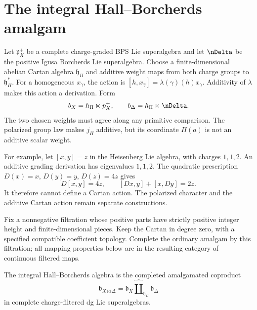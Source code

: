 \section{The integral Hall--Borcherds amalgam}
Let $\mathfrak p_X^+$ be a complete charge-graded BPS Lie superalgebra
and let $\nDelta$ be the positive Igusa Borcherds Lie superalgebra.
Choose a finite-dimensional abelian Cartan algebra $\mathfrak h_\Pi$ and additive
weight maps from both charge groups to $\mathfrak h_\Pi^*$.
For a homogeneous $x_\gamma$, the action is
$[h,x_\gamma]=\lambda(\gamma)(h)x_\gamma$.
Additivity of $\lambda$ makes this action a derivation. Form
\[
 \mathfrak b_X=\mathfrak h_\Pi\ltimes\mathfrak p_X^+,
 \qquad
 \mathfrak b_\Delta=\mathfrak h_\Pi\ltimes\nDelta.
\]
The two chosen weights must agree along any primitive comparison.
The polarized group law makes $j_\Pi$ additive, but its coordinate
$\Pi(a)$ is not an additive scalar weight.

For example, let $[x,y]=z$ in the Heisenberg Lie algebra, with charges
$1,1,2$. An additive grading derivation has eigenvalues $1,1,2$.
The quadratic prescription $D(x)=x$, $D(y)=y$, $D(z)=4z$ gives
\[
 D[x,y]=4z,\qquad [Dx,y]+[x,Dy]=2z.
\]
It therefore cannot define a Cartan action. The polarized character
and the additive Cartan action remain separate constructions.

Fix a nonnegative filtration whose positive parts have strictly positive
integer height and finite-dimensional pieces. Keep the Cartan in degree
zero, with a specified compatible coefficient topology. Complete the
ordinary amalgam by this filtration; all mapping properties below are
in the resulting category of continuous filtered maps.

\begin{definition}
The integral Hall--Borcherds algebra is the completed amalgamated coproduct
\[
 \mathfrak b_{X\boxtimes\Delta}
 =\mathfrak b_X
  \widehat\amalg_{\mathfrak h_\Pi}
  \mathfrak b_\Delta
\]
in complete charge-filtered dg Lie superalgebras.
\end{definition}

